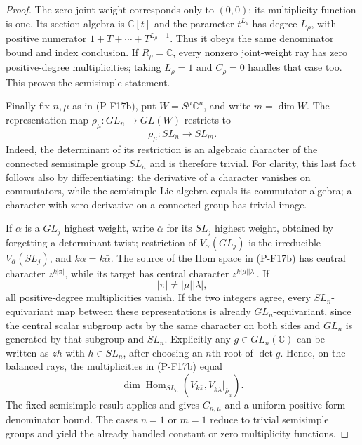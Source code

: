 \begin{proof}
The zero joint weight corresponds only to $(0,0)$; its multiplicity
function is one. Its section algebra is $\mathbb C[t]$ and the
parameter $t^{L_\rho}$ has degree $L_\rho$, with positive numerator
$1+T+\cdots+T^{L_\rho-1}$. Thus it obeys the same denominator
bound and index conclusion. If $R_\rho=\mathbb C$, every nonzero
joint-weight ray has zero positive-degree multiplicities; taking
$L_\rho=1$ and $C_\rho=0$ handles that case too. This proves
the semisimple statement.

Finally fix $n,\mu$ as in (P-F17b), put
$W=S^\mu\mathbb C^n$, and write $m=\dim W$.
The representation map $\rho_\mu:GL_n\to GL(W)$ restricts to
\[
 \overline\rho_\mu:SL_n\longrightarrow SL_m.
\]
Indeed, the determinant of its restriction is an algebraic character
of the connected semisimple group $SL_n$ and is therefore trivial.
For clarity, this last fact follows also by differentiating: the
derivative of a character vanishes on commutators, while the
semisimple Lie algebra equals its commutator algebra; a character
with zero derivative on a connected group has trivial image.

If $\alpha$ is a $GL_j$ highest weight, write $\bar\alpha$ for its
$SL_j$ highest weight, obtained by forgetting a determinant twist;
restriction of $V_\alpha(GL_j)$ is the irreducible
$V_{\bar\alpha}(SL_j)$, and $\overline{k\alpha}=k\bar\alpha$.
The source of the Hom space in (P-F17b) has central character
$z^{k|\pi|}$, while its target has central character
$z^{k|\mu||\lambda|}$. If
\[
 |\pi|\ne|\mu||\lambda|,
 \tag{P-F17f}
\]
all positive-degree multiplicities vanish. If the two integers agree,
every $SL_n$-equivariant map between these representations is already
$GL_n$-equivariant, since the central scalar subgroup acts by the
same character on both sides and $GL_n$ is generated by that subgroup
and $SL_n$. Explicitly any $g\in GL_n(\mathbb C)$ can be written
as $zh$ with $h\in SL_n$, after choosing an $n$th root of $\det g$.
Hence, on the balanced rays, the multiplicities in (P-F17b) equal
\[
 \dim\operatorname{Hom}_{SL_n}
     (V_{k\bar\pi},V_{k\bar\lambda}|_{\overline\rho_\mu}).
\]
The fixed semisimple result applies and gives $C_{n,\mu}$ and a
uniform positive-form denominator bound. The cases $n=1$ or $m=1$
reduce to trivial semisimple groups and yield the already handled
constant or zero multiplicity functions.


\end{proof}
